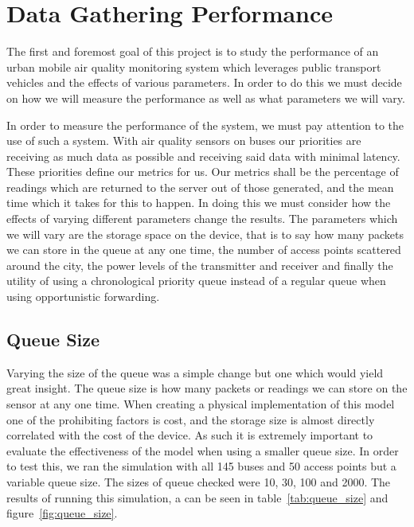 \chapter{Data Gathering Performance}\label{data_gathering_performance} 


    The first and foremost goal of this project is to study the performance of an urban mobile air quality monitoring system which leverages public transport vehicles and the effects of various parameters. In order to do this we must decide on how we will measure the performance as well as what parameters we will vary. 

    In order to measure the performance of the system, we must pay attention to the use of such a system. With air quality sensors on buses our priorities are receiving as much data as possible and receiving said data with minimal latency. These priorities define our metrics for us. Our metrics shall be the percentage of readings which are returned to the server out of those generated, and the mean time which it takes for this to happen. In doing this we must consider how the effects of varying different parameters change the results. The parameters which we will vary are the storage space on the device, that is to say how many packets we can store in the queue at any one time, the number of access points scattered around the city, the power levels of the transmitter and receiver and finally the utility of using a chronological priority queue instead of a regular queue when using opportunistic forwarding.
	

    \section{Queue Size}\label{data_gathering_performance_queue_size}

        Varying the size of the queue was a simple change but one which would yield great insight. The queue size is how many packets or readings we can store on the sensor at any one time. When creating a physical implementation of this model one of the prohibiting factors is cost, and the storage size is almost directly correlated with the cost of the device. As such it is extremely important to evaluate the effectiveness of the model when using a smaller queue size. In order to test this, we ran the simulation with all 145 buses and 50 access points but a variable queue size. The sizes of queue checked were 10, 30, 100 and 2000. The results of running this simulation, a can be seen in table~\ref{tab:queue_size} and figure~\ref{fig:queue_size}. 

